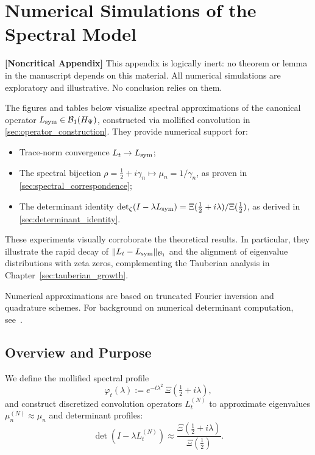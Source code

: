 \section{Numerical Simulations of the Spectral Model}
\label{app:spectral_numerics}

\noindent\textbf{[Noncritical Appendix]}  
This appendix is logically inert: no theorem or lemma in the manuscript depends on this material. All numerical simulations are exploratory and illustrative. No conclusion relies on them.

\medskip

The figures and tables below visualize spectral approximations of the canonical operator \( L_{\mathrm{sym}} \in \mathcal{B}_1(H_{\Psi}) \), constructed via mollified convolution in \cref{sec:operator_construction}. They provide numerical support for:

\begin{itemize}
  \item Trace-norm convergence \( L_t \to L_{\mathrm{sym}} \);
  \item The spectral bijection \( \rho = \tfrac{1}{2} + i\gamma_n \mapsto \mu_n = 1/\gamma_n \), as proven in \cref{sec:spectral_correspondence};
  \item The determinant identity \( \det\nolimits_{\zeta}(I - \lambda L_{\mathrm{sym}}) = \Xi(\tfrac{1}{2} + i\lambda)/\Xi(\tfrac{1}{2}) \), as derived in \cref{sec:determinant_identity}.
\end{itemize}

These experiments visually corroborate the theoretical results. In particular, they illustrate the rapid decay of \( \|L_t - L_{\mathrm{sym}}\|_{\mathcal{B}_1} \) and the alignment of eigenvalue distributions with zeta zeros, complementing the Tauberian analysis in Chapter~\ref{sec:tauberian_growth}.

Numerical approximations are based on truncated Fourier inversion and quadrature schemes. For background on numerical determinant computation, see~\cite{Bornemann2010FredholmDeterminants}.

\subsection*{Overview and Purpose}

We define the mollified spectral profile
\[
\varphi_t(\lambda) := e^{-t\lambda^2} \, \Xi\left( \tfrac{1}{2} + i\lambda \right),
\]
and construct discretized convolution operators \( L_t^{(N)} \) to approximate eigenvalues \( \mu_n^{(N)} \approx \mu_n \) and determinant profiles:
\[
\det(I - \lambda L_t^{(N)}) \approx \frac{\Xi(\tfrac{1}{2} + i\lambda)}{\Xi(\tfrac{1}{2})}.
\]

